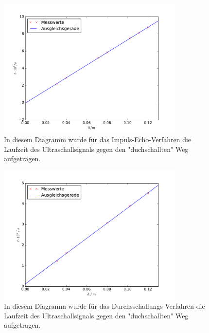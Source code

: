 \begin{figure}
  \centering
  \includegraphics[height= 7cm]{plots/IE_plot.pdf}
  \caption{In diesem Diagramm wurde für das Impuls-Echo-Verfahren die Laufzeit des Ultraschallsignals gegen den "duchschallten" Weg aufgetragen. }
  \label{fig:IEplot}
\end{figure}
\begin{figure}
  \centering
  \includegraphics[height = 7cm]{plots/DS_plot.pdf}
  \caption{In diesem Diagramm wurde für das Durchsschallungs-Verfahren die Laufzeit des Ultraschallsignals gegen den "duchschallten" Weg aufgetragen. }
  \label{fig:DSplot}
\end{figure}
\FloatBarrier

